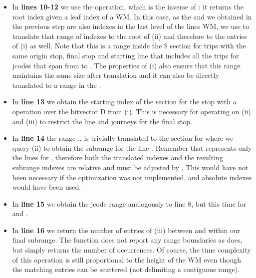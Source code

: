 \documentclass[runningheads]{llncs}
\begin{document}
\begin{itemize}
    \item In \textbf{lines 10-12} we use the  operation, which is the inverse of : it returns the root index given a leaf index of a WM. In this case, as the  and  we obtained in the previous step are also indexes in the last level of the lines WM, we use  to translate that range of indexes to the root of (ii) and therefore to the entries of (i) as well. Note that this is a range inside the $\$$ section for trips with the same origin stop, final stop and starting line that includes all the trips for jcodes that span from  to . The properties of (i) also ensure that this range maintains the same size after translation and it can also be directly translated to a range in the .
    
    \item In \textbf{line 13} we obtain the starting index of the section for the stop  with a  operation over the bitvector D from (i). This is necessary for operating on (ii) and (iii) to restrict the line and journeys for the final stop.
    
    \item In \textbf{line 14} the range $..$ is trivially translated to the section for  where we query (ii) to obtain the subrange for the line . Remember that  represents only the lines for , therefore both the translated indexes and the resulting subrange indexes are relative and must be adjusted by . This would have not been necessary if the optimization was not implemented, and absolute indexes would have been used.
    
    \item In \textbf{line 15} we obtain the jcode range analogously to line 8, but this time for  and .
    
    \item In \textbf{line 16} we return the number of entries of (iii) between  and  within our final subrange. The function  does not report any range boundaries as  does, but simply returns the number of occurrences. Of course, the time complexity of this operation is still proportional to the height of the WM even though the matching entries can be scattered (not delimiting a contiguous range).
\end{itemize}
\end{document}
